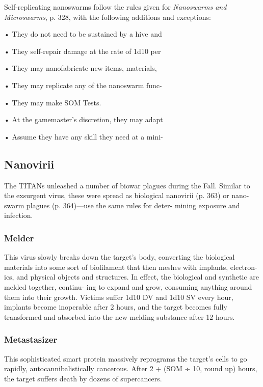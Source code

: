 Self-replicating nanoswarms follow the rules given 
for \textit{Nanoswarms and Microswarms}, p. 328, with the 
following additions and exceptions:

•  They do not need to be sustained by a hive and 

•  They self-repair damage at the rate of 1d10 per 

•  They may nanofabricate new items, materials, 

•  They may replicate any of the nanoswarm func-

•  They may make SOM Tests.

•  At the gamemaster's discretion, they may adapt 

•  Assume they have any skill they need at a mini-

\subsection{Nanovirii}

The TITANs unleashed a number of biowar plagues 
during the Fall. Similar to the exsurgent virus, these 
were spread as biological nanovirii (p. 363) or nano-
swarm plagues (p. 364)—use the same rules for deter-
mining exposure and infection.

\subsubsection{Melder}

This virus slowly breaks down the target's body, 
converting the biological materials into some sort of 
biofilament that then meshes with implants, electron-
ics, and physical objects and structures. In effect, the 
biological and synthetic are melded together, continu-
ing to expand and grow, consuming anything around 
them into their growth. Victims suffer 1d10 DV and 
1d10 SV every hour, implants become inoperable after 
2 hours, and the target becomes fully transformed 
and absorbed into the new melding substance after 
12 hours. 

\subsubsection{Metastasizer}

This sophisticated smart protein massively reprograms 
the target's cells to go rapidly, autocannibalistically 
cancerous. After 2 + (SOM ÷ 10, round up) hours, the 
target suffers death by dozens of supercancers.

